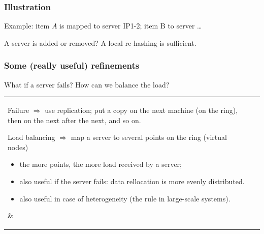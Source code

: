 \documentclass{beamer}
\begin{document}
\begin{frame}
\frametitle{Illustration}

Example: item $A$ is mapped to server IP1-2; item B to server \ldots

\vfill


\vfill

A server is added or removed? A \alert{local} re-hashing is sufficient.
\end{frame}


\begin{frame}
\frametitle{Some (really useful) refinements}

What if a server fails?  How can we balance the load? 

\vfill

\begin{tabular}{l|p{5cm}}
   \parbox{6.5cm}{


\alert{Failure} $\Rightarrow$ use replication; put a copy on the next machine
(on the ring), then on the next after the next, and so on.
  
  \vfill
  
\alert{Load balancing} $\Rightarrow$ map a server to several points on the ring
(virtual nodes)

\begin{itemize}
  \item the more points, the more load received by a server;
  \item also useful if the server fails: data rellocation is more evenly
  distributed.
  \item also useful in case of heterogeneity (the rule in large-scale systems).
\end{itemize}
  
   }  %
  & 
  \parbox{5cm}{ }
\end{tabular}

\end{frame}
\end{document}
